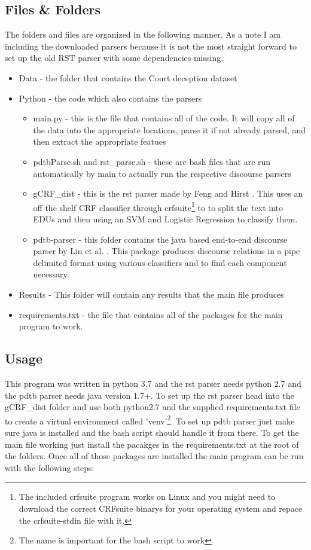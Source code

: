 \documentclass[12pt]{article}
\begin{document}
\subsection{Files \& Folders}
The folders and files are organized in the following manner. As a note I am
including the downloaded parsers because it is not the most straight forward to
set up the old RST parser with some dependencies missing.
\begin{itemize}
\item Data - the folder that contains the Court deception dataset
\item Python - the code which also contains the parsers
  \begin{itemize}
    \item main.py - this is the file that contains all of the code. It will copy
      all of the data into the appropriate locations, parse it if not already
      parsed, and then extract the appropriate featues
    \item pdtbParse.sh and rst\_parse.sh - these are bash files that are run
      automatically by main to actually run the respective discourse parsers
    \item gCRF\_dist - this is the rst parser made by Feng and Hirst
      \cite{fengTwopassDiscourseSegmentation2014,
        fengLinearTimeBottomUpDiscourse2014}. This uses an off the shelf CRF
      classifier through crfsuite\footnote{The included crfsuite program works
        on Linux and you might need to download the correct CRFsuite binarys for
      your operating system and repace the crfsuite-stdin file with it.}
    \cite{CRFsuite} to to split the text into EDUs 
      and then using an SVM and Logistic Regression to classify them.
    \item pdtb-parser - this folder contains the java based end-to-end discourse
      parser by Lin et al. \cite{linPDTBstyledEndtoendDiscourse2014}. This
      package produces discourse relations in a pipe delimited format using
      various classifiers and to find each component necessary.
    \end{itemize}
  \item Results - This folder will contain any results that the main file
    produces
  \item requirements.txt - the file that contains all of the packages for the
    main program to work.
\end{itemize}

\subsection{Usage}
This program was written in python 3.7 and the rst parser needs python 2.7 and
the pdtb parser needs java version 1.7+. To set up the rst parser head into the
gCRF\_dist folder and use both python2.7 and the supplied requirements.txt file
to create a virtual environment called 'venv'\footnote{The name is important for
the bash script to work}. To set up pdtb parser just make sure java is installed
and the bash script should handle it from there. To get the main file working
just install the pacakges in the requirements.txt at the root of the folders.
Once all of those packages are installed the main program can be run with the
following steps:
\end{document}
